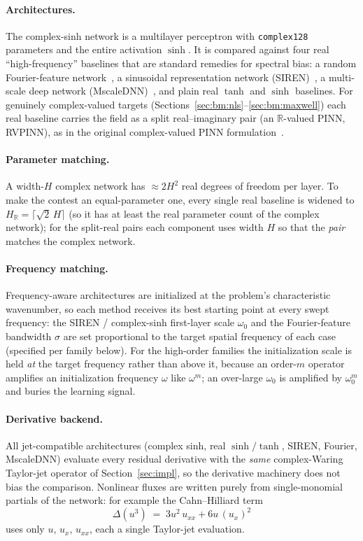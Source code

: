 \paragraph{Architectures.}
The complex-sinh network is a multilayer perceptron with \texttt{complex128}
parameters and the entire activation \(\sinh\). It is compared against four real
``high-frequency'' baselines that are standard remedies for spectral bias:
a random Fourier-feature network~\cite{Tancik2020Fourier}, a sinusoidal
representation network (SIREN)~\cite{Sitzmann2020SIREN}, a multi-scale deep
network (MscaleDNN)~\cite{Liu2020MscaleDNN}, and plain real \(\tanh\) and
\(\sinh\) baselines. For genuinely complex-valued targets
(Sections~\ref{sec:bm:nls}--\ref{sec:bm:maxwell}) each real baseline carries the
field as a split real--imaginary pair (an \(\mathbb{R}\)-valued PINN, RVPINN),
as in the original complex-valued PINN formulation~\cite{Raissi2019}.

\paragraph{Parameter matching.}
A width-\(H\) complex network has \(\approx 2H^2\) real degrees of freedom per
layer. To make the contest an equal-parameter one, every single real baseline is
widened to \(H_{\mathbb{R}} = \lceil \sqrt{2}\,H \rceil\) (so it has at least the
real parameter count of the complex network); for the split-real pairs each
component uses width \(H\) so that the \emph{pair} matches the complex network.

\paragraph{Frequency matching.}
Frequency-aware architectures are initialized at the problem's characteristic
wavenumber, so each method receives its best starting point at every swept
frequency: the SIREN / complex-sinh first-layer scale \(\omega_0\) and the
Fourier-feature bandwidth \(\sigma\) are set proportional to the target spatial
frequency of each case (specified per family below). For the high-order families
the initialization scale is held \emph{at} the target frequency rather than
above it, because an order-\(m\) operator amplifies an initialization frequency
\(\omega\) like \(\omega^{m}\); an over-large \(\omega_0\) is amplified by
\(\omega_0^{m}\) and buries the learning signal.

\paragraph{Derivative backend.}
All jet-compatible architectures (complex sinh, real \(\sinh/\tanh\), SIREN,
Fourier, MscaleDNN) evaluate every residual derivative with the \emph{same}
complex-Waring Taylor-jet operator of Section~\ref{sec:impl}, so the derivative
machinery does not bias the comparison. Nonlinear fluxes are written purely from
single-monomial partials of the network: for example the Cahn--Hilliard term
\begin{equation}\label{eq:lap_u3}
  \Delta(u^3) \;=\; 3u^2\,u_{xx} + 6u\,(u_x)^2
\end{equation}
uses only \(u\), \(u_x\), \(u_{xx}\), each a single Taylor-jet evaluation.

